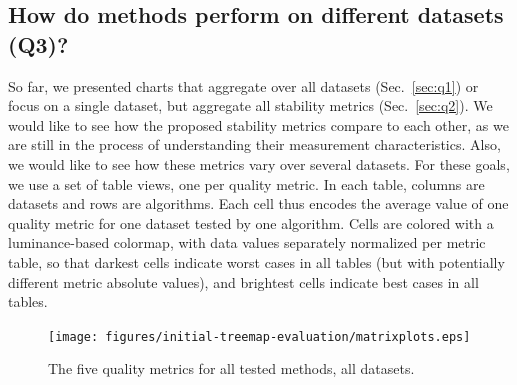 \subsection{How do methods perform on different datasets (Q3)?}
\label{sec:q3}
%
%
So far, we presented charts that aggregate over all datasets (Sec.~\ref{sec:q1}) or focus on a single dataset, but aggregate all stability metrics (Sec.~\ref{sec:q2}). We would like to see how the proposed stability metrics compare to each other, as we are still in the process of understanding their measurement characteristics. Also, we would like to see how these metrics vary over several datasets. For these goals, we use a set of table views, one per quality metric. In each table, columns are datasets and rows are algorithms. Each cell thus encodes the average value of one quality metric for one dataset tested by one algorithm. Cells are colored with a luminance-based colormap, with data values separately normalized per metric table, so that darkest cells indicate worst cases in all tables (but with potentially different metric absolute values), and brightest cells indicate best cases in all tables.

\begin{figure}[htbp!]
\centering
  \texttt{[image: figures/initial-treemap-evaluation/matrixplots.eps]}
\vspace{-0.1cm}
    \caption{The five quality metrics for all tested methods, all datasets.}
\vspace{-0.2cm}
  \label{fig:table}
\end{figure}


